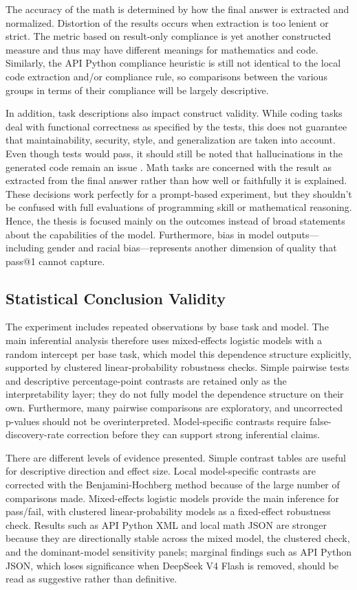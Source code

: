 The accuracy of the math is determined by how the final answer is extracted and normalized. Distortion of the results occurs when extraction is too lenient or strict. The metric based on result-only compliance is yet another constructed measure and thus may have different meanings for mathematics and code. Similarly, the API Python compliance heuristic is still not identical to the local code extraction and/or compliance rule, so comparisons between the various groups in terms of their compliance will be largely descriptive.

In addition, task descriptions also impact construct validity. While coding tasks deal with functional correctness as specified by the tests, this does not guarantee that maintainability, security, style, and generalization are taken into account. Even though tests would pass, it should still be noted that hallucinations in the generated code remain an issue \cite{zhang2025hallucination}. Math tasks are concerned with the result as extracted from the final answer rather than how well or faithfully it is explained. These decisions work perfectly for a prompt-based experiment, but they shouldn’t be confused with full evaluations of programming skill or mathematical reasoning. Hence, the thesis is focused mainly on the outcomes instead of broad statements about the capabilities of the model. Furthermore, bias in model outputs—including gender and racial bias—represents another dimension of quality that pass@1 cannot capture.

\subsection{Statistical Conclusion Validity}

The experiment includes repeated observations by base task and model. The main inferential analysis therefore uses mixed-effects logistic models with a random intercept per base task, which model this dependence structure explicitly, supported by clustered linear-probability robustness checks. Simple pairwise tests and descriptive percentage-point contrasts are retained only as the interpretability layer; they do not fully model the dependence structure on their own. Furthermore, many pairwise comparisons are exploratory, and uncorrected p-values should not be overinterpreted. Model-specific contrasts require false-discovery-rate correction before they can support strong inferential claims.

There are different levels of evidence presented. Simple contrast tables are useful for descriptive direction and effect size. Local model-specific contrasts are corrected with the Benjamini-Hochberg method because of the large number of comparisons made. Mixed-effects logistic models provide the main inference for pass/fail, with clustered linear-probability models as a fixed-effect robustness check. Results such as API Python XML and local math JSON are stronger because they are directionally stable across the mixed model, the clustered check, and the dominant-model sensitivity panels; marginal findings such as API Python JSON, which loses significance when DeepSeek V4 Flash is removed, should be read as suggestive rather than definitive.

